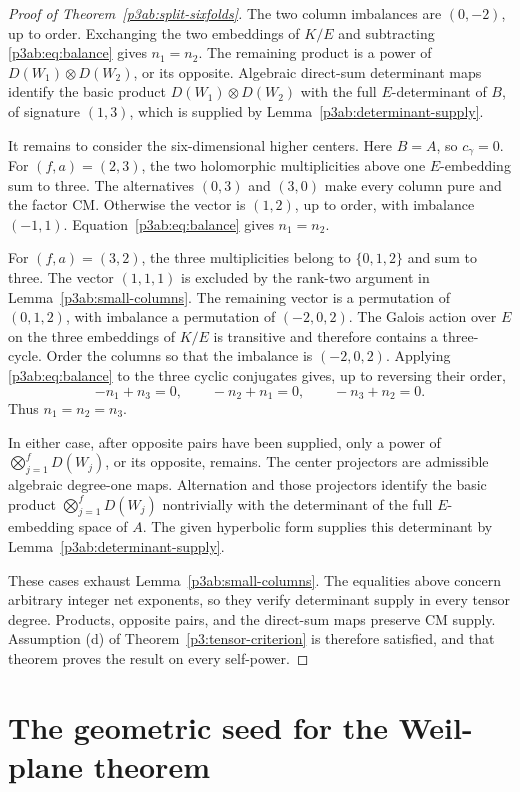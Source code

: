 \documentclass[11pt]{article}
\numberwithin{equation}{section}
\begin{document}
\begin{proof}[Proof of Theorem~\ref{p3ab:split-sixfolds}]
The two column imbalances are \((0,-2)\), up to order.
Exchanging the two embeddings of \(K/E\) and subtracting
\eqref{p3ab:eq:balance} gives \(n_1=n_2\).  The remaining
product is a power of \(D(W_1)\otimes D(W_2)\), or its
opposite.  Algebraic direct-sum determinant maps identify the
basic product \(D(W_1)\otimes D(W_2)\)
with the full \(E\)-determinant of \(B\), of signature
\((1,3)\), which is supplied by
Lemma~\ref{p3ab:determinant-supply}.

It remains to consider the six-dimensional higher centers.
Here \(B=A\), so \(c_\gamma=0\).
For \((f,a)=(2,3)\), the two holomorphic multiplicities above
one \(E\)-embedding sum to three.  The alternatives \((0,3)\)
and \((3,0)\) make every column pure and the factor CM.
Otherwise the vector is \((1,2)\), up to order, with imbalance
\((-1,1)\).  Equation~\eqref{p3ab:eq:balance} gives
\(n_1=n_2\).

For \((f,a)=(3,2)\), the three multiplicities belong to
\(\{0,1,2\}\) and sum to three.  The vector \((1,1,1)\)
is excluded by the rank-two argument in
Lemma~\ref{p3ab:small-columns}.  The remaining vector is a
permutation of \((0,1,2)\), with imbalance a permutation of
\((-2,0,2)\).  The Galois action over \(E\) on the three
embeddings of \(K/E\) is transitive and therefore contains a
three-cycle.  Order the columns so that the imbalance is
\((-2,0,2)\).  Applying \eqref{p3ab:eq:balance} to the three
cyclic conjugates gives, up to reversing their order,
\[
 -n_1+n_3=0,\qquad -n_2+n_1=0,\qquad -n_3+n_2=0.
\]
Thus \(n_1=n_2=n_3\).

In either case, after opposite pairs have been supplied, only a
power of \(\bigotimes_{j=1}^fD(W_j)\), or its opposite,
remains.  The center projectors are admissible algebraic
degree-one maps.  Alternation and those projectors identify
the basic product \(\bigotimes_{j=1}^fD(W_j)\) nontrivially
with the determinant of the full
\(E\)-embedding space of \(A\).  The given hyperbolic form
supplies this determinant by
Lemma~\ref{p3ab:determinant-supply}.

These cases exhaust Lemma~\ref{p3ab:small-columns}.  The
equalities above concern arbitrary integer net exponents, so they
verify determinant supply in every tensor degree.  Products,
opposite pairs, and the direct-sum maps preserve CM supply.
Assumption \textnormal{(d)} of
Theorem~\ref{p3:tensor-criterion} is therefore satisfied, and
that theorem proves the result on every self-power.
\end{proof}

\section{The geometric seed for the Weil-plane theorem}
\label{p3sw:appendix}
\label{p3sw:support-component}
\end{document}

